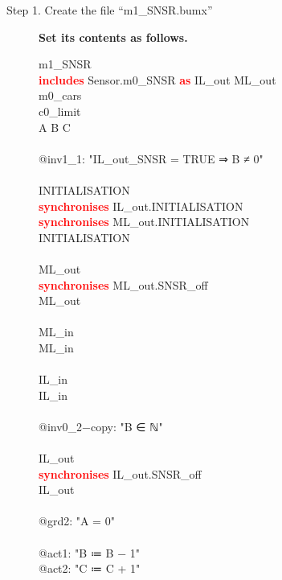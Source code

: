 \begin{description}
	\item[Step 1. Create the file ``m1\_SNSR.bumx''] \textbf{Set its contents as follows.}
	
		\begin{center}
		\begin{Bcode}
			\ifplastex
			\Bmachine{} m1_SNSR\\
			\textcolor{red}{\textbf{includes}} Sensor.m0_SNSR \textcolor{red}{\textbf{as}} IL_out ML_out\\
			\Brefines{} m0_cars\\
			\Bsees{} c0_limit\\
			\Bvariables{} A B C\\
			\Binvariants\\
			@inv1_1: "IL_out_SNSR = TRUE ⇒ B ≠ 0"\\
			\Bevents\\
			INITIALISATION \Bextended\\
			\textcolor{red}{\textbf{synchronises}} IL_out.INITIALISATION\\
			\textcolor{red}{\textbf{synchronises}} ML_out.INITIALISATION\\
			\Brefines{} INITIALISATION\\
			\Bend\\
			ML_out \Bextended\\
			\textcolor{red}{\textbf{synchronises}} ML_out.SNSR_off\\
			\Brefines{} ML_out\\
			\Bend\\
			ML_in \Bextended\\
			\Brefines{} ML_in\\
			\Bend\\
			IL_in \Bextended\\
			\Brefines{} IL_in\\
			\Bwhen\\
			@inv0_2−copy: "B ∈ ℕ" \Btheorem\\
			\Bend\\
			IL_out\\
			\textcolor{red}{\textbf{synchronises}} IL_out.SNSR_off\\
			\Brefines{} IL_out\\
			\Bwhen\\
			@grd2: "A = 0"\\
			\Bthen\\
			@act1: "B ≔ B − 1"\\
			@act2: "C ≔ C + 1"\\

\end{Bcode}
\end{center}
\end{description}
